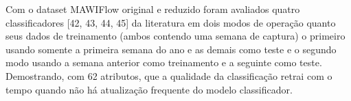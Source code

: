 Com o dataset MAWIFlow original e reduzido foram avaliados quatro classificadores [42, 43, 44, 45]
da literatura em dois modos de operação quanto seus dados de treinamento
(ambos contendo uma semana de captura) o primeiro usando somente a primeira semana do ano e as demais
como teste e o segundo modo usando a semana anterior como treinamento e a seguinte como teste.
Demostrando, com 62 atributos, que a qualidade da classificação retrai com o tempo quando não há
atualização frequente do modelo classificador.

